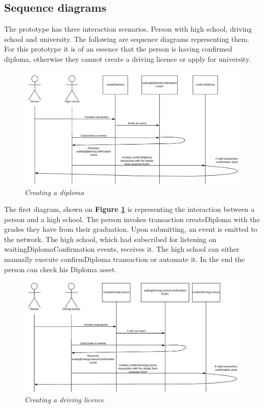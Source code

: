 \documentclass[a4paper,11pt]{report}
\begin{document}
\subsection{Sequence diagrams}
\label{sd}
The prototype has three interaction scenarios. Person with high school, driving school and university. The following are sequence diagrams representing them. For this prototype it is of an essence that the person is having confirmed diploma, otherwise they cannot create a driving licence or apply for university.  

\begin{figure}[h]
\centering
  \includegraphics[width=16cm]{personCreateDiplomaSD.png}
  \caption{\textit{Creating a diploma}}
  \label{personDiplomaSD}
\end{figure}

The first diagram, shown on \textbf{Figure \ref{personDiplomaSD}} is representing the interaction between a person and a high school. The person invokes transaction createDiploma with the grades they have from their graduation. Upon submitting, an event is emitted to the network. The high school, which had subscribed for listening on waitingDiplomaConfirmation events, receives it. The high school can either manually execute confirmDiploma transaction or automate it. In the end the person can check his Diploma asset.  

\begin{figure}[h]
\centering
  \includegraphics[width=16cm]{personCreateDLSD.png}
  \caption{\textit{Creating a driving licence}}
  \label{personCreateDLSD}
\end{figure}
\end{document}
